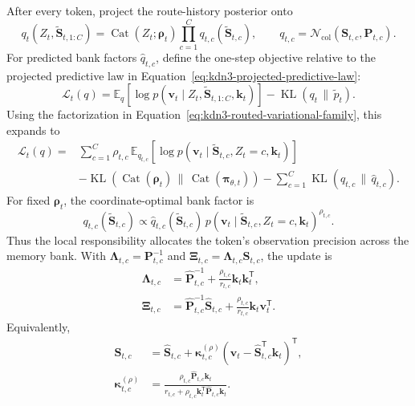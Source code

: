\documentclass[11pt]{article}
\newcommand{\ve}[1]{\boldsymbol{#1}}
\newcommand{\tr}{\mathsf{T}}
\newcommand{\KL}{\operatorname{KL}}
\newcommand{\E}{\mathbb{E}}
\newcommand{\Normal}{\mathcal{N}}
\newcommand{\Cat}{\operatorname{Cat}}
\begin{document}
After every token, project the route-history posterior onto
\begin{equation}
  q_t(Z_t,\widetilde{\ve{S}}_{t,1:C})
  =
  \Cat(Z_t;\ve{\rho}_t)
  \prod_{c=1}^{C}
  q_{t,c}(\widetilde{\ve{S}}_{t,c}),
  \qquad
  q_{t,c}
  =
  \Normal_{\mathrm{col}}(\ve{S}_{t,c},\ve{P}_{t,c}).
  \label{eq:kdn3-routed-variational-family}
\end{equation}
For predicted bank factors $\widehat q_{t,c}$, define the one-step objective relative to the
projected predictive law in Equation~\eqref{eq:kdn3-projected-predictive-law}:
\begin{equation}
  \mathcal{L}_t(q)
  =\E_q[\log p(\ve{v}_t\mid Z_t,\widetilde{\ve{S}}_{t,1:C},\ve{k}_t)]
   -\KL(q_t\,\|\,\widetilde p_t).
  \label{eq:kdn3-online-elbo-compact}
\end{equation}
Using the factorization in Equation~\eqref{eq:kdn3-routed-variational-family}, this expands to
\begin{equation}
\begin{aligned}
  \mathcal{L}_t(q)
  ={}&
  \sum_{c=1}^{C}\rho_{t,c}\,
  \E_{q_{t,c}}\!\left[
    \log p(\ve{v}_t\mid
      \widetilde{\ve{S}}_{t,c},Z_t=c,\ve{k}_t)
  \right]
  \\
  &-\KL\!\left(
    \Cat(\ve{\rho}_t)\,\|\,\Cat(\ve{\pi}_{\theta,t})
  \right)
  -\sum_{c=1}^{C}
   \KL(q_{t,c}\,\|\,\widehat q_{t,c}).
\end{aligned}
  \label{eq:kdn3-online-elbo}
\end{equation}
For fixed $\ve{\rho}_t$, the coordinate-optimal bank factor is
\begin{equation}
  q_{t,c}(\widetilde{\ve{S}}_{t,c})
  \propto
  \widehat q_{t,c}(\widetilde{\ve{S}}_{t,c})\,
  p(\ve{v}_t\mid
    \widetilde{\ve{S}}_{t,c},Z_t=c,\ve{k}_t)^{\rho_{t,c}}.
  \label{eq:kdn3-power-posterior}
\end{equation}
Thus the local responsibility allocates the token's observation precision across the memory bank.
With
$\ve{\Lambda}_{t,c}=\ve{P}_{t,c}^{-1}$ and
$\ve{\Xi}_{t,c}=\ve{\Lambda}_{t,c}\ve{S}_{t,c}$, the update is
\begin{equation}
\begin{aligned}
  \ve{\Lambda}_{t,c}
  &=
  \widehat{\ve{P}}_{t,c}^{-1}
  +\frac{\rho_{t,c}}{r_{t,c}}\ve{k}_t\ve{k}_t^{\tr},
  \\
  \ve{\Xi}_{t,c}
  &=
  \widehat{\ve{P}}_{t,c}^{-1}\widehat{\ve{S}}_{t,c}
  +\frac{\rho_{t,c}}{r_{t,c}}\ve{k}_t\ve{v}_t^{\tr}.
\end{aligned}
  \label{eq:kdn3-fractional-natural-update}
\end{equation}
Equivalently,
\begin{equation}
\begin{aligned}
  \ve{S}_{t,c}
  &=
  \widehat{\ve{S}}_{t,c}
  +\ve{\kappa}_{t,c}^{(\rho)}
   \left(
     \ve{v}_t-\widehat{\ve{S}}_{t,c}^{\tr}\ve{k}_t
   \right)^{\tr},
  \\
  \ve{\kappa}_{t,c}^{(\rho)}
  &=
  \frac{
    \rho_{t,c}\widehat{\ve{P}}_{t,c}\ve{k}_t
  }{
    r_{t,c}
    +\rho_{t,c}\ve{k}_t^{\tr}
      \widehat{\ve{P}}_{t,c}\ve{k}_t
  }.
\end{aligned}
  \label{eq:kdn3-fractional-kalman-update}
\end{equation}
\end{document}
